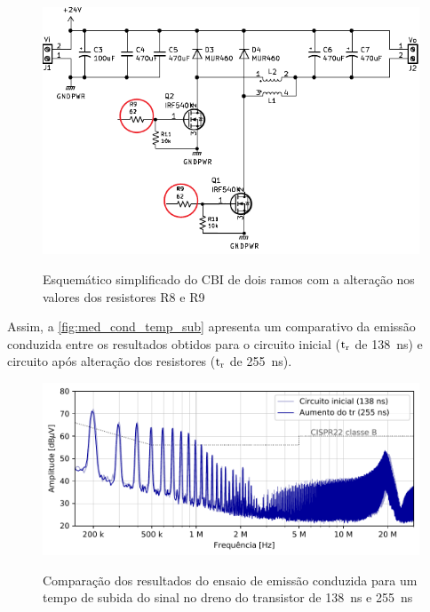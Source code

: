     \begin{figure}[H]
    	\centering
    	\caption{Esquemático simplificado do CBI de dois ramos com a alteração nos valores dos resistores R8 e R9}
    	\includegraphics[scale=1.2]{pdf/layout/Esquematico_CBI_tr.pdf}
        \label{fig:esquematico_cbi_3}
    \end{figure}
    
    Assim, a \autoref{fig:med_cond_temp_sub} apresenta um comparativo da emissão conduzida entre os resultados obtidos para o circuito inicial ($\text{t}_\text{r}$ de \SI{138}{\nano\second}) e circuito após alteração dos resistores ($\text{t}_\text{r}$ de \SI{255}{\nano\second}). 
    
    \begin{figure}[H]
    	\centering 
    	\caption{Comparação dos resultados do ensaio de emissão conduzida para um tempo de subida do sinal no dreno do transistor de \SI{138}{\nano\second} e \SI{255}{\nano\second}}
    	\includegraphics[scale=.9]{pdf/cond/Aumento do tr do transistor2.pdf}
    	\label{fig:med_cond_temp_sub}
    \end{figure}
    
